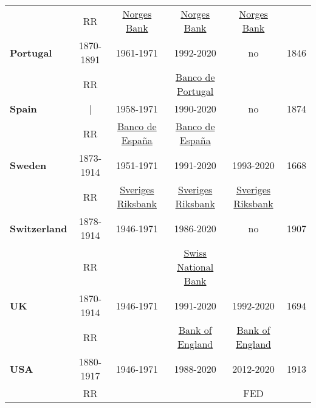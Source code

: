 \begin{landscape}
\begin{table}[]
\begin{longtable}{l*{1}{cccc|c}}
    & RR \citeyear{Reinhart2009} & \href{https://www.norges-bank.no/en/topics/about/History/Norges-Banks-history/}{Norges Bank}  & \href{https://www.norges-bank.no/en/topics/about/History/Norges-Banks-history/}{Norges Bank} & \href{https://www.norges-bank.no/en/topics/about/History/Norges-Banks-history/}{Norges Bank} & \\
[1ex]
\textbf{Portugal}  & 1870-1891  & 1961-1971 & 1992-2020 & no & 1846\\
         & RR \citeyear{Reinhart2009}  &  \cite{Bordo1995B}  & \href{https://www.bportugal.pt/}{Banco de Portugal} &  \\
[1ex]
\textbf{Spain}  & |  & 1958-1971 & 1990-2020 & no & 1874\\
         & RR \citeyear{Reinhart2009}  & \href{https://www.bde.es/bde/en/}{Banco de España} & \href{https://www.bde.es/bde/en/}{Banco de España} &  & \\
[1ex]
\textbf{Sweden}    & 1873-1914  & 1951-1971  & 1991-2020 & 1993-2020 & 1668\\
    & RR \citeyear{Reinhart2009}  & \href{https://www.riksbank.se/en-gb/about-the-riksbank/history/}{Sveriges Riksbank} & \href{https://www.riksbank.se/en-gb/about-the-riksbank/history/}{Sveriges Riksbank} & \href{https://www.riksbank.se/en-gb/about-the-riksbank/history/}{Sveriges Riksbank} \\
[1ex]
\textbf{Switzerland}  & 1878-1914  & 1946-1971 & 1986-2020 & no & 1907 \\
         & RR \citeyear{Reinhart2009}  & \cite{Baltensperger2017} &  \href{https://www.snb.ch/en/iabout/snb/hist/id/hist_wpc}{Swiss National Bank} &  & \\
[1ex]
\textbf{UK}       & 1870-1914 & 1946-1971  & 1991-2020 & 1992-2020 & 1694\\
    & RR \citeyear{Reinhart2009} & \cite{Bordo1999}  & \href{https://www.bankofengland.co.uk/about/history}{Bank of England} & \href{https://www.bankofengland.co.uk/about/history}{Bank of England} \\
[1ex]
\textbf{USA}     & 1880-1917 & 1946-1971  & 1988-2020  & 2012-2020  & 1913\\
    & RR \citeyear{Reinhart2009}  & \cite{Bordo1999} & \cite{Goodfriend2004} & FED \\
\hline\hline
\end{longtable}
\vspace{-3ex}
\end{table}
\end{landscape}